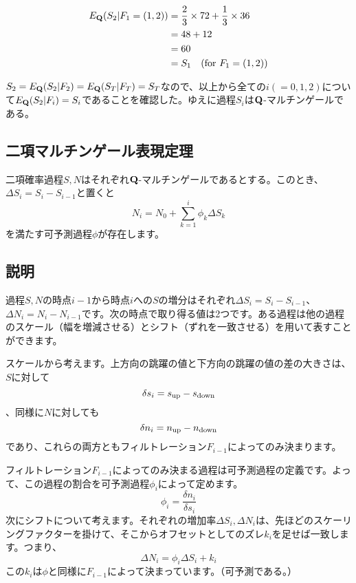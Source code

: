 \documentclass[uplatex,a4j,12pt,dvipdfmx]{jsarticle}
\begin{document}
\begin{align*}
	E_{\bf Q}( S_{2} | F_1=(1,2) ) & = \frac{2}{3} \times 72 + \frac{1}{3} \times 36 \\
	                               & = 48+12                                         \\
	                               & = 60                                            \\
	                               & = S_{1} \quad (\text{for } F_{1} = (1,2))
\end{align*}

$S_{2} = E_{\bf Q}( S_{2} | F_2 ) = E_{\bf Q}( S_{T} | F_{T} ) = S_{T}$なので、以上から全ての$i(=0,1,2)$について$E_{\bf Q}( S_{2} | F_i ) = S_{i}$であることを確認した。ゆえに過程$S_{i}$は${\bf Q}$-マルチンゲールである。

\subsection{二項マルチンゲール表現定理}
二項確率過程$S,N$はそれぞれ${\bf Q}$-マルチンゲールであるとする。このとき、$\Delta S_{i} = S_{i} - S_{i-1}$と置くと\[N_{i} = N_{0} + \sum^{i}_{k=1} \phi_{k} \Delta S_{k}\]を満たす可予測過程$\phi$が存在します。

\subsection{説明}
過程$S,N$の時点$i-1$から時点$i$への$S$の増分はそれぞれ$\Delta S_{i} = S_{i} - S_{i-1}$、$\Delta N_{i} = N_{i} - N_{i-1}$です。次の時点で取り得る値は2つです。ある過程は他の過程のスケール（幅を増減させる）とシフト（ずれを一致させる）を用いて表すことができます。

スケールから考えます。上方向の跳躍の値と下方向の跳躍の値の差の大きさは、$S$に対して\[\delta s_{i} = s_{\rm up} - s_{\rm down}\]、同様に$N$に対しても\[\delta n_{i} = n_{\rm up} - n_{\rm down}\]であり、これらの両方ともフィルトレーション$F_{i-1}$によってのみ決まります。

フィルトレーション$F_{i-1}$によってのみ決まる過程は可予測過程の定義です。よって、この過程の割合を可予測過程$\phi_{i}$によって定めます。\[\phi_{i} = \frac{\delta n_{i}}{\delta s_{i}}\]次にシフトについて考えます。それぞれの増加率$\Delta S_{i} , \Delta N_{i}$は、先ほどのスケーリングファクターを掛けて、そこからオフセットとしてのズレ$k_{i}$を足せば一致します。つまり、\[\Delta N_{i} = \phi_{i} \Delta S_{i} + k_{i}\]この$k_{i}$は$\phi$と同様に$F_{i-1}$によって決まっています。（可予測である。）
\end{document}

